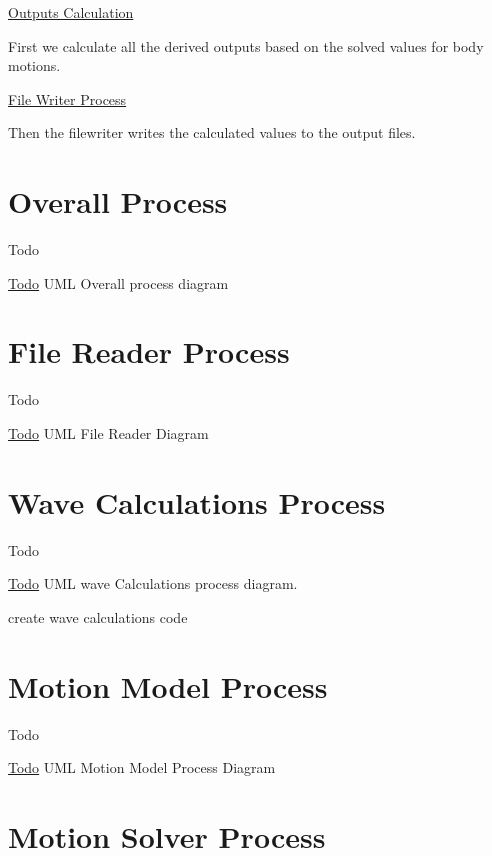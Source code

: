\hyperlink{uml_outputscalculation}{Outputs Calculation}

First we calculate all the derived outputs based on the solved values for body motions.

\hyperlink{uml_writingfiles}{File Writer Process}

Then the filewriter writes the calculated values to the output files. \hypertarget{uml_overall}{}\section{Overall Process}\label{uml_overall}
\begin{DoxyRefDesc}{Todo}
\item[\hyperlink{todo__todo000005}{Todo}]U\-M\-L Overall process diagram\end{DoxyRefDesc}
\hypertarget{uml_filereader}{}\section{File Reader Process}\label{uml_filereader}
\begin{DoxyRefDesc}{Todo}
\item[\hyperlink{todo__todo000001}{Todo}]U\-M\-L File Reader Diagram\end{DoxyRefDesc}
\hypertarget{uml_wavecalculation}{}\section{Wave Calculations Process}\label{uml_wavecalculation}
\begin{DoxyRefDesc}{Todo}
\item[\hyperlink{todo__todo000007}{Todo}]U\-M\-L wave Calculations process diagram. 

create wave calculations code\end{DoxyRefDesc}
\hypertarget{uml_motionmodel}{}\section{Motion Model Process}\label{uml_motionmodel}
\begin{DoxyRefDesc}{Todo}
\item[\hyperlink{todo__todo000002}{Todo}]U\-M\-L Motion Model Process Diagram\end{DoxyRefDesc}
\hypertarget{uml_motionsolver}{}\section{Motion Solver Process}\label{uml_motionsolver}
